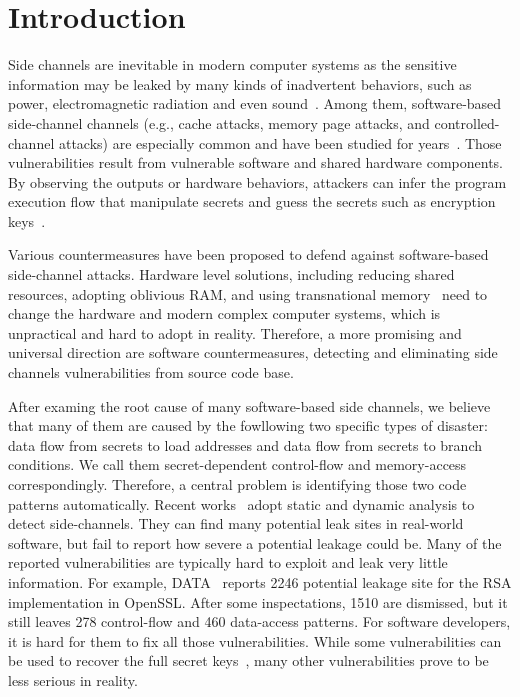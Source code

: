 \section{Introduction}
Side channels are inevitable in modern computer systems as the sensitive information 
may be leaked by many kinds of inadvertent behaviors, 
such as power, electromagnetic radiation and even sound~\cite{}. 
Among them, software-based side-channel channels (e.g., cache attacks, memory page attacks,
and controlled-channel attacks) are especially common 
and have been studied for years~\cite{}. 
Those vulnerabilities result from vulnerable software and shared hardware components.
By observing the outputs or hardware behaviors, attackers can
infer the program execution flow that manipulate secrets and 
guess the secrets such as encryption keys~\cite{}.

Various countermeasures have been proposed to defend against 
software-based side-channel attacks. Hardware level solutions, 
including reducing shared resources, adopting oblivious RAM, and using
transnational memory~\cite{182946,203878,217537} need to change the hardware
and modern complex computer systems, which is unpractical and hard to adopt in 
reality. Therefore, a more promising and universal direction are software countermeasures, 
detecting and eliminating side channels vulnerabilities from source code base.

After examing the root cause of many software-based side channels, we believe that
many of them are caused by the fowllowing two specific types of disaster: 
data flow from secrets to load addresses and data flow from secrets to branch conditions.
We call them secret-dependent control-flow and memory-access correspondingly.
Therefore, a central problem is identifying those two code patterns automatically.
Recent works~\cite{203878} adopt static and dynamic analysis
to detect side-channels.
They can find many potential leak sites in real-world software, 
but fail to report how severe a potential leakage could be. 
Many of the reported vulnerabilities are typically hard to exploit
and leak very little information. For example, DATA~\cite{} reports
2246 potential leakage site for the RSA implementation in OpenSSL.
After some inspectations, 1510 are dismissed, but it still
leaves 278 control-flow and 460 data-access patterns. For software
developers, it is hard for them to fix all those vulnerabilities.
While some vulnerabilities can be used to recover the full secret
keys~\cite{}, many other vulnerabilities prove to be less serious in reality.

